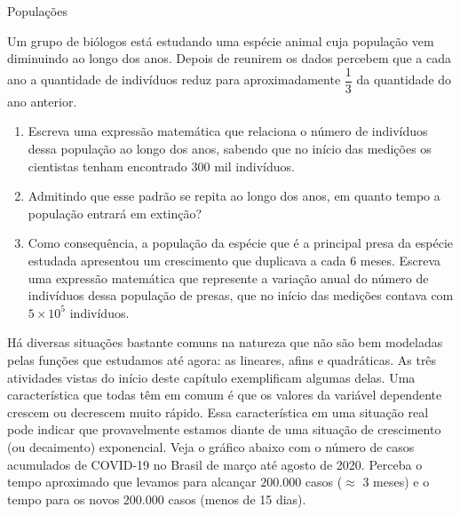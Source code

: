 \begin{task}{Populações}

Um grupo de biólogos está estudando uma espécie animal cuja população vem diminuindo ao longo dos anos. Depois de reunirem os dados percebem que a cada ano a quantidade de indivíduos reduz para aproximadamente $\dfrac{1}{3}$ da quantidade do ano anterior.

\begin{enumerate}

\item {}
Escreva uma expressão matemática que relaciona o número de indivíduos dessa população ao longo dos anos, sabendo que no início das medições os cientistas tenham encontrado $300$ mil indivíduos.

\item {}
Admitindo que esse padrão se repita ao longo dos anos, em quanto tempo a população entrará em extinção?

\item {}
Como consequência, a população da espécie que é a principal presa da espécie estudada apresentou um crescimento que duplicava a cada 6 meses. Escreva uma expressão matemática que represente a variação anual do número de indivíduos dessa população de presas, que no início das medições contava com $5\times10^5$ indivíduos.

\end{enumerate}

\end{task}


Há diversas situações bastante comuns na natureza que não são bem modeladas pelas funções que estudamos até agora: as lineares, afins e quadráticas. As três atividades vistas do início deste capítulo exemplificam algumas delas. Uma característica que todas têm em comum é que os valores da variável dependente crescem ou decrescem muito rápido. Essa característica em uma situação real pode indicar que provavelmente estamos diante de uma situação de crescimento (ou decaimento) exponencial. Veja o gráfico abaixo com o número de casos acumulados de COVID-19 no Brasil de março até agosto de 2020. Perceba o tempo aproximado que levamos para alcançar $200.000$ casos ($ \approx $ 3 meses) e o tempo para os novos $200.000$ casos (menos de 15 dias).

